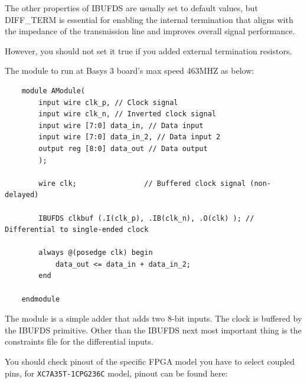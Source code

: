 \documentclass{report}
\begin{document}
The other properties of IBUFDS are usually set to default values, but DIFF\_TERM is essential for enabling the internal termination that aligns with the impedance of the transmission line and improves overall signal performance.

However, you should not set it true if you added external termination resistors. 

The module to run at Basys 3 board's max speed 463MHZ as below:
\begin{verbatim}
    module AModule(
        input wire clk_p, // Clock signal
        input wire clk_n, // Inverted clock signal
        input wire [7:0] data_in, // Data input
        input wire [7:0] data_in_2, // Data input 2
        output reg [8:0] data_out // Data output
        );
    
        wire clk;                // Buffered clock signal (non-delayed)
    
        IBUFDS clkbuf (.I(clk_p), .IB(clk_n), .O(clk) ); // Differential to single-ended clock
    
        always @(posedge clk) begin
            data_out <= data_in + data_in_2;
        end
    
    endmodule
\end{verbatim}
The module is a simple adder that adds two 8-bit inputs. The clock is buffered by the IBUFDS primitive. Other than the IBUFDS next most important thing is the constraints file for the differential inputs. 

You should check pinout of the specific FPGA model you have to select coupled pins, for \texttt{XC7A35T-1CPG236C} model, pinout can be found here: 
\end{document}
